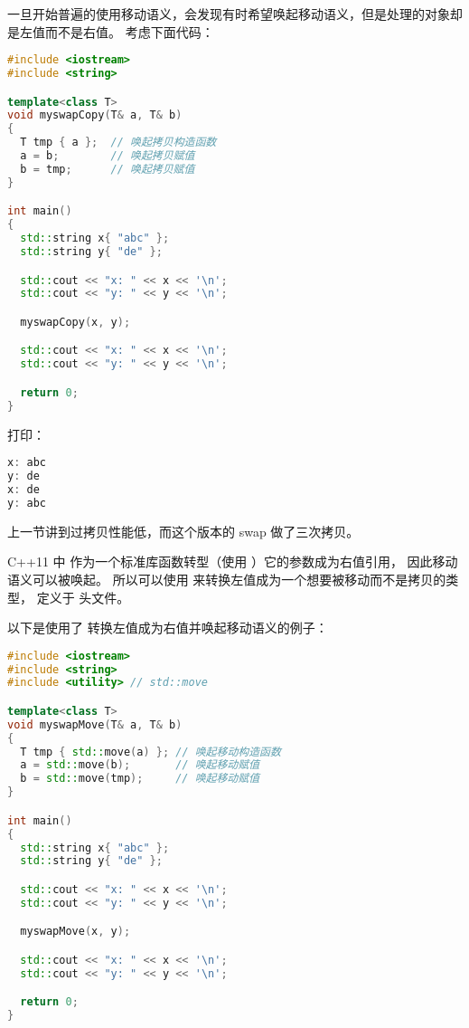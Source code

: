 \documentclass[../../LearnCpp.tex]{subfiles}
\begin{document}

一旦开始普遍的使用移动语义，会发现有时希望唤起移动语义，但是处理的对象却是左值而不是右值。
考虑下面代码：

\begin{lstlisting}[language=C++]
#include <iostream>
#include <string>

template<class T>
void myswapCopy(T& a, T& b)
{
  T tmp { a };  // 唤起拷贝构造函数
  a = b;        // 唤起拷贝赋值
  b = tmp;      // 唤起拷贝赋值
}

int main()
{
  std::string x{ "abc" };
  std::string y{ "de" };

  std::cout << "x: " << x << '\n';
  std::cout << "y: " << y << '\n';

  myswapCopy(x, y);

  std::cout << "x: " << x << '\n';
  std::cout << "y: " << y << '\n';

  return 0;
}
\end{lstlisting}

打印：

\begin{lstlisting}[language=C++]
x: abc
y: de
x: de
y: abc
\end{lstlisting}

上一节讲到过拷贝性能低，而这个版本的 swap 做了三次拷贝。

C++11 中  作为一个标准库函数转型（使用 ）它的参数成为右值引用，
因此移动语义可以被唤起。
所以可以使用  来转换左值成为一个想要被移动而不是拷贝的类型，
 定义于  头文件。

以下是使用了  转换左值成为右值并唤起移动语义的例子：

\begin{lstlisting}[language=C++]
#include <iostream>
#include <string>
#include <utility> // std::move

template<class T>
void myswapMove(T& a, T& b)
{
  T tmp { std::move(a) }; // 唤起移动构造函数
  a = std::move(b);       // 唤起移动赋值
  b = std::move(tmp);     // 唤起移动赋值
}

int main()
{
  std::string x{ "abc" };
  std::string y{ "de" };

  std::cout << "x: " << x << '\n';
  std::cout << "y: " << y << '\n';

  myswapMove(x, y);

  std::cout << "x: " << x << '\n';
  std::cout << "y: " << y << '\n';

  return 0;
}
\end{lstlisting}
\end{document}
